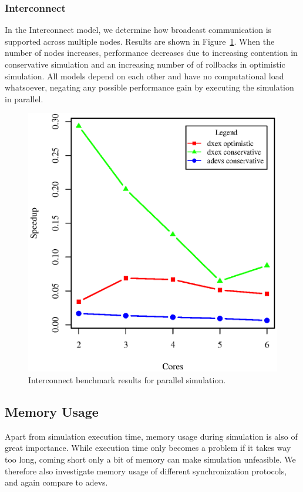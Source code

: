 \vspace{1mm}
\subsubsection{Interconnect}
In the Interconnect model, we determine how broadcast communication is supported across multiple nodes.
Results are shown in Figure~\ref{fig:interconnect_benchmark_parallel}.
When the number of nodes increases, performance decreases due to increasing contention in conservative simulation and an increasing number of of rollbacks in optimistic simulation.
All models depend on each other and have no computational load whatsoever, negating any possible performance gain by executing the simulation in parallel.

\begin{figure}
    \center
    \includegraphics[width=\plotfraction\columnwidth]{fig/interconnect_parallel.eps}
    \caption{Interconnect benchmark results for parallel simulation.}
    \label{fig:interconnect_benchmark_parallel}
\end{figure}

\subsection{Memory Usage}
Apart from simulation execution time, memory usage during simulation is also of great importance.
While execution time only becomes a problem if it takes way too long, coming short only a bit of memory can make simulation unfeasible.
We therefore also investigate memory usage of different synchronization protocols, and again compare to adevs.


